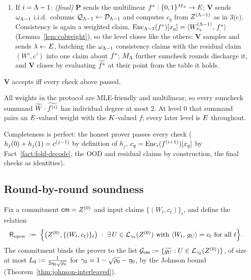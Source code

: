 \begin{protocol}
\begin{enumerate}[itemsep=0.5pt,topsep=2pt]
\item If $i = \Lambda - 1$: \emph{(final)} $\mathbf{P}$ sends the multilinear $f^{\ast} : \{0,1\}^{M_\Lambda} \to E$; $\mathbf{V}$ sends $\omega_{\Lambda-1}$ i.i.d.\ columns $\mathcal{Q}_{\Lambda-1} \leftarrow \mathcal{D}_{\Lambda-1}$ and computes $c_q$ from $Z^{(\Lambda-1)}$ as in 3(c). Consistency is again a weighted claim, $\mathrm{Enc}_{\Lambda-1}(f^{\ast})[x_q] = \langle W^{(\Lambda-1)}_{x_q},\, f^{\ast} \rangle$ (Lemma~\ref{lem:colweight}), so the level closes like the others: $\mathbf{V}$ samples and sends $\lambda \leftarrow E$, batching the $\omega_{\Lambda-1}$ consistency claims with the residual claim $(W', c')$ into one claim about $f^{\ast}$; $M_\Lambda$ further sumcheck rounds discharge it, and $\mathbf{V}$ closes by evaluating $\widetilde{f^{\ast}}$ at their point from the table it holds.
\end{enumerate}
$\mathbf{V}$ accepts iff every check above passed.
\end{protocol}

All weights in the protocol are MLE-friendly and multilinear, so every sumcheck summand $\widetilde{W} \cdot \widetilde{f^{(i)}}$ has individual degree at most $2$. At level $0$ that summand pairs an $E$-valued weight with the $K$-valued $f$; every later level is $E$ throughout.

Completeness is perfect: the honest prover passes every check ($h_j(0) + h_j(1) = c^{(j-1)}$ by definition of $h_j$, $c_q = \mathrm{Enc}_i(f^{(i+1)})[x_q]$ by Fact~\ref{fact:fold-decode}, the OOD and residual claims by construction, the final checks as identities).

\subsection{Round-by-round soundness}\label{sec:soundness}

Fix a commitment $\mathsf{cm} = Z^{(0)}$ and input claims $\{(W_t, c_t)\}_t$, and define the relation
\[
\mathsf{R}_{\mathrm{open}} \;:=\; \Bigl\{ \bigl(Z^{(0)}, \{(W_t, c_t)\}_t\bigr) \;:\; \exists\, U \in \mathcal{L}_{\gamma_0}(Z^{(0)}) \text{ with } \langle W_t,\, g_U \rangle = c_t \text{ for all } t \Bigr\}.
\]
The commitment binds the prover to the list $\mathcal{G}_{\mathsf{cm}} := \{\widetilde{g_U} : U \in \mathcal{L}_{\gamma_0}(Z^{(0)})\}$, of size at most $L_0 := \tfrac{1}{2\eta_0\sqrt{\rho_0}}$ for $\gamma_0 = 1 - \sqrt{\rho_0} - \eta_0$, by the Johnson bound (Theorem~\ref{thm:johnson-interleaved}).

